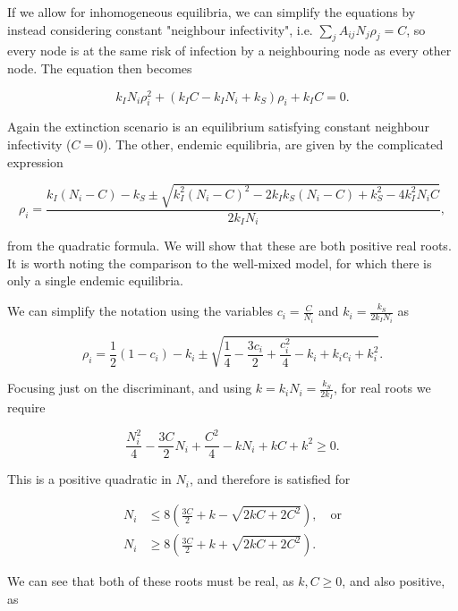 \documentclass[12pt,a4paper,openany,twoside]{book}
\begin{document}
If we allow for inhomogeneous equilibria, we can simplify the equations by instead considering constant "neighbour infectivity", i.e. $\sum_j A_{ij} N_j \rho_j = C$, so every node is at the same risk of infection by a neighbouring node as every other node. The equation then becomes

\begin{equation}
	k_I N_i \rho_i^2 + (k_I C - k_I N_i + k_S) \rho_i + k_I C= 0.
\end{equation}

Again the extinction scenario is an equilibrium satisfying constant neighbour infectivity ($C = 0$). The other, endemic equilibria, are given by the complicated expression

\begin{equation}
	\rho_i = \frac {k_I (N_i - C) - k_S \pm \sqrt{k_I^2 (N_i - C)^2 - 2 k_I k_S (N_i - C) + k_S^2 - 4 k_I^2 N_i C}} {2 k_I N_i},
\end{equation}

from the quadratic formula. We will show that these are both positive real roots. It is worth noting the comparison to the well-mixed model, for which there is only a single endemic equilibria.

We can simplify the notation using the variables $c_i = \frac C {N_i}$ and $k_i = \frac {k_S} {2k_I N_i}$ as

\begin{equation}
	\rho_i = \frac 1 2 (1 - c_i) - k_i \pm \sqrt{\frac 1 4 - \frac {3 c_i} 2 + \frac {c_i^2} {4} - k_i + k_i c_i + k_i^2}.
\end{equation}

Focusing just on the discriminant, and using $k = k_i N_i = \frac {k_S} {2 k_I}$, for real roots we require

\begin{equation}
	\frac {N_i^2} {4} - \frac {3C} {2} N_i + \frac {C^2} {4} - k N_i + k C + k^2 \geq 0.
\end{equation}

This is a positive quadratic in $N_i$, and therefore is satisfied for

\begin{align}
	N_i &\leq 8 \left(\frac {3C} {2} + k - \sqrt{2 k C + 2 C^2}\right), \quad \text{or} \\
	N_i &\geq 8 \left(\frac {3 C} {2} + k + \sqrt{2 k C + 2 C^2}\right).
\end{align}

We can see that both of these roots must be real, as $k, C \geq 0$, and also positive, as
\end{document}
